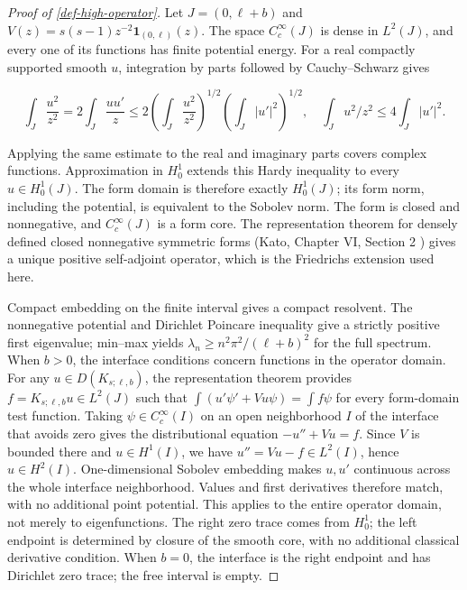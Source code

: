 \documentclass[11pt,a4paper]{article}
\theoremstyle{proofmanuscript}
\begin{document}
\begin{proof}[Proof of \ref{def-high-operator}]

Let \(J=(0,\ell+b)\) and \(V(z)=s(s-1)z^{-2}\mathbf1_{(0,\ell)}(z)\). The space \(C_c^\infty(J)\) is dense in \(L^2(J)\), and every one of its functions has finite potential energy. For a real compactly supported smooth \(u\), integration by parts followed by Cauchy--Schwarz gives

\[
\int_J\frac{u^2}{z^2}=2\int_J\frac{uu'}z
\le2\left(\int_J\frac{u^2}{z^2}\right)^{1/2}\left(\int_J|u'|^2\right)^{1/2},
\quad \int_Ju^2/z^2\le4\int_J|u'|^2.
\]

Applying the same estimate to the real and imaginary parts covers complex functions. Approximation in \(H_0^1\) extends this Hardy inequality to every \(u\in H_0^1(J)\). The form domain is therefore exactly \(H_0^1(J)\); its form norm, including the potential, is equivalent to the Sobolev norm. The form is closed and nonnegative, and \(C_c^\infty(J)\) is a form core. The representation theorem for densely defined closed nonnegative symmetric forms (Kato, Chapter VI, Section 2 \cite{nc:kato}) gives a unique positive self-adjoint operator, which is the Friedrichs extension used here.

Compact embedding on the finite interval gives a compact resolvent. The nonnegative potential and Dirichlet Poincare inequality give a strictly positive first eigenvalue; min--max yields \(\lambda_n\ge n^2\pi^2/(\ell+b)^2\) for the full spectrum. When \(b>0\), the interface conditions concern functions in the operator domain. For any \(u\in D(K_{s;\ell,b})\), the representation theorem provides \(f=K_{s;\ell,b}u\in L^2(J)\) such that \(\int(u'\psi'+Vu\psi)=\int f\psi\) for every form-domain test function. Taking \(\psi\in C_c^\infty(I)\) on an open neighborhood \(I\) of the interface that avoids zero gives the distributional equation \(-u''+Vu=f\). Since \(V\) is bounded there and \(u\in H^1(I)\), we have \(u''=Vu-f\in L^2(I)\), hence \(u\in H^2(I)\). One-dimensional Sobolev embedding makes \(u,u'\) continuous across the whole interface neighborhood. Values and first derivatives therefore match, with no additional point potential. This applies to the entire operator domain, not merely to eigenfunctions. The right zero trace comes from \(H_0^1\); the left endpoint is determined by closure of the smooth core, with no additional classical derivative condition. When \(b=0\), the interface is the right endpoint and has Dirichlet zero trace; the free interval is empty.

\end{proof}
\end{document}
